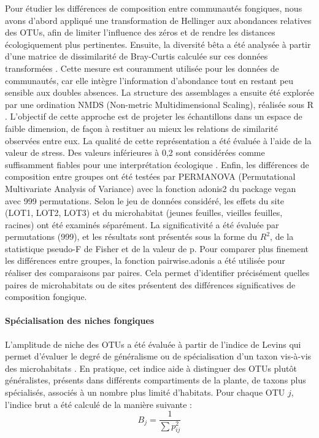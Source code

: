 \documentclass[a4paper,12pt]{article}
\begin{document}
Pour étudier les différences de composition entre communautés fongiques, nous avons d’abord appliqué une transformation de Hellinger aux abondances relatives des OTUs, afin de limiter l’influence des zéros et de rendre les distances écologiquement plus pertinentes. Ensuite, la diversité bêta a été analysée à partir d’une matrice de dissimilarité de Bray-Curtis calculée sur ces données transformées \citep{bray1957ordination}. Cette mesure est couramment utilisée pour les données de communautés, car elle intègre l’information d’abondance tout en restant peu sensible aux doubles absences. La structure des assemblages a ensuite été explorée par une ordination NMDS (Non-metric Multidimensional Scaling), réalisée sous R \citep{kruskal1964nonmetric,minchin1987evaluation}. L’objectif de cette approche est de projeter les échantillons dans un espace de faible dimension, de façon à restituer au mieux les relations de similarité observées entre eux. La qualité de cette représentation a été évaluée à l’aide de la valeur de stress. Des valeurs inférieures à 0,2 sont considérées comme suffisamment fiables pour une interprétation écologique \citep{kruskal1964nonmetric}. Enfin, les différences de composition entre groupes ont été testées par PERMANOVA (Permutational Multivariate Analysis of Variance) avec la fonction adonis2 du package vegan \citep{anderson2001new} avec 999 permutations. Selon le jeu de données considéré, les effets du site (LOT1, LOT2, LOT3) et du microhabitat (jeunes feuilles, vieilles feuilles, racines) ont été examinés séparément. La significativité a été évaluée par permutations (999), et les résultats sont présentés sous la forme du $R^2$, de la statistique pseudo-F de Fisher et de la valeur de p. Pour comparer plus finement les différences entre groupes, la fonction pairwise.adonis a été utilisée pour réaliser des comparaisons par paires. Cela permet d’identifier précisément quelles paires de microhabitats ou de sites présentent des différences significatives de composition fongique.


\paragraph{Spécialisation des niches fongiques}

L’amplitude de niche des OTUs a été évaluée à partir de l’indice de Levins \citep{levins1968evolution} qui permet d’évaluer le degré de généralisme ou de spécialisation d’un taxon vis-à-vis des microhabitats . En pratique, cet indice aide à distinguer des OTUs plutôt généralistes, présents dans différents compartiments de la plante, de taxons plus spécialisés, associés à un nombre plus limité d’habitats. Pour chaque OTU $j$, l’indice brut a été calculé de la manière suivante : 
\[
B_j = \frac{1}{\sum p_{ij}^2}
\]
\end{document}

